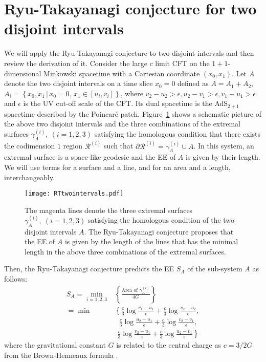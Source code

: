 \documentclass[%
 reprint,
 amsmath,amssymb,
 aps,
]{revtex4-2}
\begin{document}
\section{\label{sec:2} Ryu-Takayanagi conjecture for two disjoint intervals}


    We will apply the Ryu-Takayanagi conjecture to two disjoint intervals and then review the derivation of it. Consider the large $c$ limit CFT on the $1+1$-dimensional Minkowski spacetime with a Cartesian coordinate $(x_0,x_1)$. Let $A$ denote the two disjoint intervals on a time slice $x_0=0$ defined as $A = A_1 + A_2$, $A_i= \left\{x_0, x_1\, |\, x_0=0, \, x_1 \in [u_i,v_i]\right\}$, where $v_2-u_2>\epsilon, u_2-v_1>\epsilon, v_1-u_1>\epsilon$ and $\epsilon$ is the UV cut-off scale of the CFT. Its dual spacetime is the AdS$_{2+1}$ spacetime described by the Poincar\'{e} patch. Figure~\ref{fig:RTtwointervals} shows a schematic picture of the above two disjoint intervals and the three combinations of the extremal surfaces $\gamma_A^{(i)},\ (i=1,2,3)$ satisfying the homologous condition that there exists the codimension $1$ region $\mathcal{R}^{(i)}$ such that $\partial \mathcal{R}^{(i)} = \gamma_A^{(i)} \cup A$. In this system, an extremal surface is a space-like geodesic and the EE of $A$ is given by their length. We will use terms for a surface and a line, and for an area and a length, interchangeably.
\begin{figure}[t]
    \texttt{[image: RTtwointervals.pdf]}
    \caption{
        \label{fig:RTtwointervals} The magenta lines denote the three extremal surfaces $\gamma_A^{(i)},\ (i=1,2,3)$ satisfying the homologous condition of the two disjoint intervals $A$. The Ryu-Takayanagi conjecture proposes that the EE of $A$ is given by the length of the lines that has the minimal length in the above three combinations of the extremal surfaces.
    }
\end{figure}
    Then, the Ryu-Takayanagi conjecture predicts the EE $S_A$ of the sub-system $A$ as follows:
\begin{align}
    S_A \label{eq:Ryu-Takayanagi conjecture}
    = \min_{i=1,2,3} & \left\{\frac{\text{Area of } \gamma_A^{(i)}}{4G} \right\} \\
    =\min &\left\{
    \frac{c}{3}\log\frac{v_1-u_1}{\epsilon}+\frac{c}{3}\log\frac{v_2-u_2}{\epsilon},\right.\nonumber\\ 
    &\ \ \, \frac{c}{3}\log\frac{u_2-u_1}{\epsilon}+\frac{c}{3}\log\frac{v_2-v_1}{\epsilon},\nonumber\\
    &\ \, \left. \frac{c}{3}\log\frac{v_2-u_1}{\epsilon}+\frac{c}{3}\log\frac{u_2-v_1}{\epsilon}
    \right\}
\end{align}
    where the gravitational constant $G$ is related to the central charge as $c = 3/2G$ from the Brown-Henneaux formula \cite{Brown:1986nw}.
\end{document}
